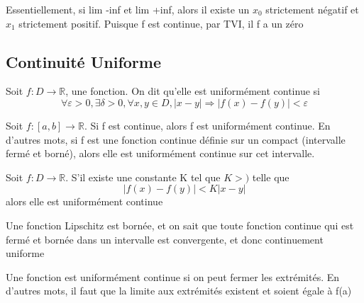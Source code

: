 \documentclass{article}
\begin{document}
\begin{problem}[Montrer que si f est continue est $\lim_{n \to -\infty}
    a_n = -\infty$ et $\lim_{n \to \infty} \infty$, alors f possède au
    moins un zéro]
    Essentiellement, si lim -inf et lim +inf, alors il existe un $x_0$
    strictement négatif et $x_1$ strictement positif. Puisque f est
    continue, par TVI, il f a un zéro
\end{problem}

\subsection{Continuité Uniforme}

\begin{definition}
    Soit $f:D \to \mathbb{R}$, une fonction. On dit qu'elle est
    uniformément continue si $$\forall \varepsilon > 0, \exists \delta >0,
    \forall x,y \in D, |x-y| \Longrightarrow |f(x) - f(y)|< \varepsilon$$
\end{definition}

\begin{theorem}
    Soit $f:[a,b] \to \mathbb{R}$. Si f est continue, alors f est
    uniformément continue. En d'autres mots, si f est une fonction
    continue définie sur un compact (intervalle fermé et borné), alors
    elle est uniformément continue sur cet intervalle.
\end{theorem}

\begin{theorem}
    Soit $f:D \to \mathbb{R}$. S'il existe une constante K tel que
    $K >)$ telle que $$ |f(x) - f(y)| < K |x-y|$$ alors elle est
    uniformément continue
\end{theorem}

\begin{remark}
    Une fonction Lipschitz est bornée, et on sait que toute fonction
    continue qui est fermé et bornée dans un intervalle est convergente,
    et donc continuement uniforme
\end{remark}

\begin{problem}
    Une fonction est uniformément continue si on peut fermer les extrémités. En
    d'autres mots, il faut que la limite aux extrémités existent et soient
    égale à f(a)
\end{problem}

\pagebreak
\end{document}
